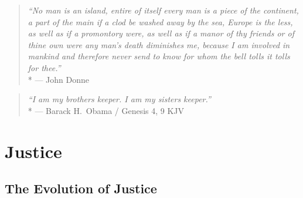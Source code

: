 
\begin{quote}
	\emph{``No man is an island, entire of itself every man is a piece of the continent, a part of the main if a clod be washed away by the sea, Europe is the less, as well as if a promontory were, as well as if a manor of thy friends or of thine own were any man’s death diminishes me, because I am involved in mankind and therefore never send to know for whom the bell tolls it tolls for thee.''}
	\\*
	--- John Donne
\end{quote}


\begin{quote}
	\emph{``I am my brothers keeper.
	I am my sisters keeper.''}
	\\*
	--- Barack H.\ Obama / Genesis 4, 9 KJV
\end{quote}

\section{Justice}

\subsection{The Evolution of Justice}



